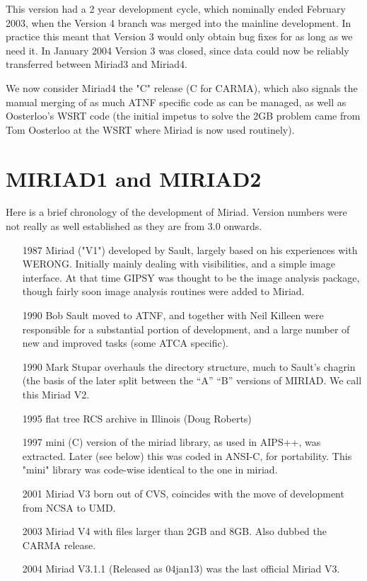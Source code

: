 This version had a 2 year development cycle, which nominally ended February 2003,
when the Version 4 branch was merged into the mainline development. 
In practice this meant that Version 3 would
only obtain bug fixes for as long as we need it. In January 2004 Version 3
was closed, since data could now be reliably transferred between
Miriad3 and Miriad4.

We now consider Miriad4 the "C" release (C for CARMA), which also signals the 
manual merging of as much ATNF specific code as can be managed, 
as well as Oosterloo's WSRT code (the initial
impetus to solve the 2GB problem came from Tom Oosterloo at the WSRT where Miriad
is now used routinely).


\section{MIRIAD1 and MIRIAD2}

Here is a brief chronology of the development of Miriad. Version numbers were not
really as well established as they are from 3.0 onwards.

\begin{enumerate}
\item[1987] Miriad ("V1") developed by Sault, largely based on his experiences
with WERONG. Initially mainly dealing with visibilities, and a simple image
interface. At that time GIPSY was thought to be the image analysis package,
though fairly soon image analysis routines were added to Miriad.

\item[1990] Bob Sault moved to ATNF, and together with Neil Killeen were
responsible for a substantial portion of development, and a large number
of new and improved tasks (some ATCA specific).

\item[1990] Mark Stupar overhauls the directory structure, much to Sault's
chagrin (the basis of the later split between the ``A'' ``B'' versions of
MIRIAD.  We call this Miriad V2.

\item[1995] flat tree RCS archive in Illinois (Doug Roberts)

\item[1997] mini (C) version of the miriad library, as used in AIPS++, was extracted. 
Later (see below) this was coded in ANSI-C, for portability. This "mini"
library was code-wise identical to the one in miriad.

\item[2001] Miriad V3 born out of CVS, coincides with the move of development from
NCSA to UMD.

\item[2003] Miriad V4 with files larger than 2GB and 8GB. 
Also dubbed the CARMA release.

\item[2004] Miriad V3.1.1 (Released as 04jan13) was the last official
Miriad V3.


\end{enumerate}

